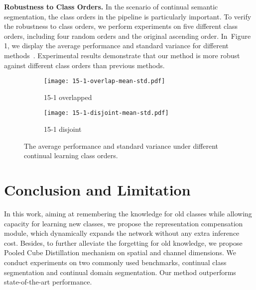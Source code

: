 \documentclass[10pt,twocolumn,letterpaper]{article}
\newcommand{\figref}[1]{Figure 1}\newcommand{\tabref}[1]{Table 1}\newcommand{\secref}[1]{Section 1}
\newcommand{\figref}[1]{Fig.~\ref{#1}}\newcommand{\tabref}[1]{Tab.~\ref{#1}}\newcommand{\secref}[1]{Sec.~\ref{#1}}
\begin{document}
\textbf{Robustness to Class Orders.}
In the scenario of continual semantic segmentation, the class orders in the pipeline is particularly important.
To verify the robustness to class orders,
we perform experiments on five different class orders, including four random orders and the original ascending order.
In~\figref{fig:classorder},
we display the average performance and standard variance for different methods~\cite{ilt,mib,sdr,plop}.
Experimental results demonstrate that our method is more robust against different class orders than previous methods.














\begin{figure}[!thp] 
	\centering
	\begin{small}
		\centering
		\begin{subfigure}{0.49\linewidth}
			\texttt{[image: 15-1-overlap-mean-std.pdf]}
			\caption{15-1 overlapped}
		\end{subfigure}
		\begin{subfigure}{0.49\linewidth}
			\texttt{[image: 15-1-disjoint-mean-std.pdf]}
			\caption{15-1 disjoint}
		\end{subfigure}
	\end{small}
	\vskip -0.1in
	\caption{The average performance and standard variance under different continual learning class orders.
	}\label{fig:classorder}
	\vskip -0.2in
\end{figure}








\section{Conclusion and Limitation}
In this work,
aiming at remembering the knowledge for old classes while allowing capacity for learning new classes,
we propose the representation compensation module,
which dynamically expands the network without any extra inference cost.
Besides,
to further alleviate the forgetting for old knowledge,
we propose Pooled Cube Distillation mechanism on spatial and channel dimensions.
We conduct experiments on two commonly used benchmarks,
continual class segmentation and continual domain segmentation.
Our method outperforms state-of-the-art performance.
\end{document}

